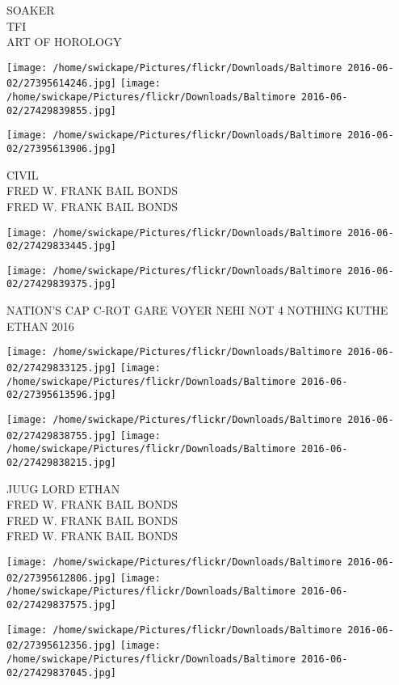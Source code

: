 \documentclass[10pt,letterpaper]{article}
\begin{document}
SOAKER\\
TFI\\
ART OF HOROLOGY\\
\pagebreak

\texttt{[image: /home/swickape/Pictures/flickr/Downloads/Baltimore 2016-06-02/27395614246.jpg]}
\texttt{[image: /home/swickape/Pictures/flickr/Downloads/Baltimore 2016-06-02/27429839855.jpg]}

\vspace{0.25in}
\texttt{[image: /home/swickape/Pictures/flickr/Downloads/Baltimore 2016-06-02/27395613906.jpg]}

CIVIL\\
FRED W. FRANK BAIL BONDS\\
FRED W. FRANK BAIL BONDS\\
\pagebreak

\texttt{[image: /home/swickape/Pictures/flickr/Downloads/Baltimore 2016-06-02/27429833445.jpg]}

\vspace{0.25in}
\texttt{[image: /home/swickape/Pictures/flickr/Downloads/Baltimore 2016-06-02/27429839375.jpg]}

NATION'S CAP C{-}ROT GARE VOYER NEHI NOT 4 NOTHING KUTHE\\
ETHAN 2016\\
\pagebreak

\texttt{[image: /home/swickape/Pictures/flickr/Downloads/Baltimore 2016-06-02/27429833125.jpg]}
\texttt{[image: /home/swickape/Pictures/flickr/Downloads/Baltimore 2016-06-02/27395613596.jpg]}

\texttt{[image: /home/swickape/Pictures/flickr/Downloads/Baltimore 2016-06-02/27429838755.jpg]}
\texttt{[image: /home/swickape/Pictures/flickr/Downloads/Baltimore 2016-06-02/27429838215.jpg]}

JUUG LORD ETHAN\\
FRED W. FRANK BAIL BONDS\\
FRED W. FRANK BAIL BONDS\\
FRED W. FRANK BAIL BONDS\\
\pagebreak

\texttt{[image: /home/swickape/Pictures/flickr/Downloads/Baltimore 2016-06-02/27395612806.jpg]}
\texttt{[image: /home/swickape/Pictures/flickr/Downloads/Baltimore 2016-06-02/27429837575.jpg]}

\texttt{[image: /home/swickape/Pictures/flickr/Downloads/Baltimore 2016-06-02/27395612356.jpg]}
\texttt{[image: /home/swickape/Pictures/flickr/Downloads/Baltimore 2016-06-02/27429837045.jpg]}
\end{document}
